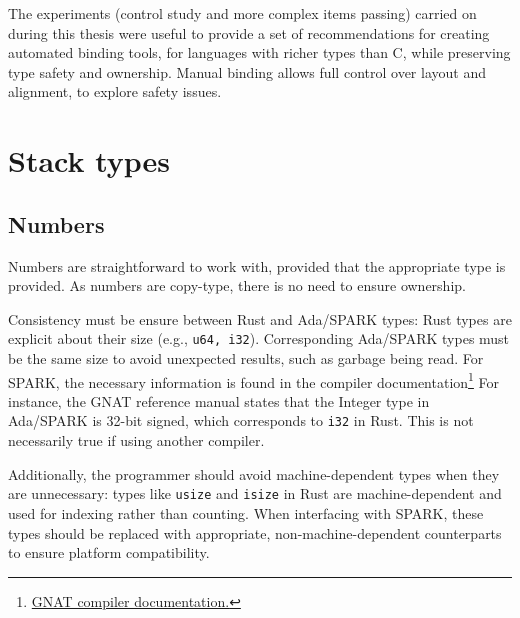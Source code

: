 \documentclass[nomenclature, english, bibtex]{kththesis}
\begin{document}
The experiments (control study and more complex items passing) carried on during this thesis were useful to provide a set of recommendations for creating automated binding tools, for languages with richer types than C, while preserving type safety and ownership. Manual binding allows full control over layout and alignment, to explore safety issues.


\section{Stack types}

\subsection{Numbers}
\label{sec:numbers}
Numbers are straightforward to work with, provided that the appropriate type is provided. As numbers are \gls{copy-type}, there is no need to ensure ownership. 

Consistency must be ensure between Rust and Ada/SPARK types: Rust types are explicit about their size (e.g., \texttt{u64, i32}). Corresponding Ada/SPARK types must be the same size to avoid unexpected results, such as garbage being read. For SPARK, the necessary information is found in the compiler documentation\footnote{\href{https://docs.adacore.com/gnat_rm-docs/html/gnat_rm/gnat_rm/implementation_defined_characteristics.html}{GNAT compiler documentation.}}
For instance, the GNAT reference manual states that the Integer type in Ada/SPARK is 32-bit signed, which corresponds to \texttt{i32} in Rust. This is not necessarily true if using another compiler.

Additionally, the programmer should avoid machine-dependent types when they are unnecessary: types like \texttt{usize} and \texttt{isize} in Rust are machine-dependent and used for indexing rather than counting. When interfacing with SPARK, these types should be replaced with appropriate, non-machine-dependent counterparts to ensure platform compatibility.
\end{document}
